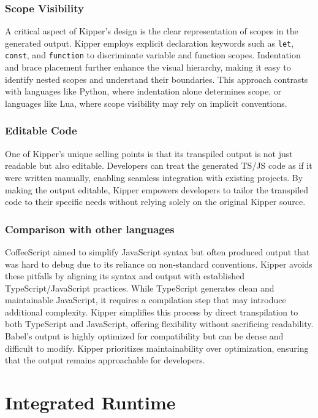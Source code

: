 \subsubsection{Scope Visibility}

A critical aspect of Kipper's design is the clear representation of scopes in the generated output. Kipper employs explicit declaration keywords such as \lstinline|let|, \lstinline|const|, and \lstinline|function| to discriminate variable and function scopes. Indentation and brace placement further enhance the visual hierarchy, making it easy to identify nested scopes and understand their boundaries. This approach contrasts with languages like Python, where indentation alone determines scope, or languages like Lua, where scope visibility may rely on implicit conventions.

\subsubsection{Editable Code}

One of Kipper's unique selling points is that its transpiled output is not just readable but also editable. Developers can treat the generated TS/JS code as if it were written manually, enabling seamless integration with existing projects. By making the output editable, Kipper empowers developers to tailor the transpiled code to their specific needs without relying solely on the original Kipper source.

\subsubsection{Comparison with other languages}

CoffeeScript aimed to simplify JavaScript syntax but often produced output that was hard to debug due to its reliance on non-standard conventions. Kipper avoids these pitfalls by aligning its syntax and output with established TypeScript/JavaScript practices. While TypeScript generates clean and maintainable JavaScript, it requires a compilation step that may introduce additional complexity. Kipper simplifies this process by direct \gls{transpilation} to both TypeScript and JavaScript, offering flexibility without sacrificing readability. Babel's output is highly optimized for compatibility but can be dense and difficult to modify. Kipper prioritizes maintainability over optimization, ensuring that the output remains approachable for developers.

\section{Integrated Runtime}
\label{sec:integrated-runtime}

